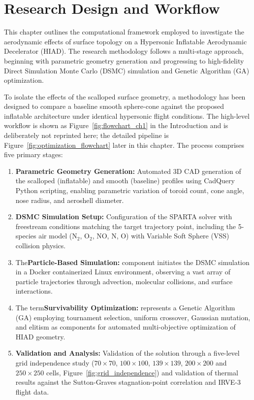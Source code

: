 \section{Research Design and Workflow}
This chapter outlines the computational framework employed to investigate the aerodynamic effects of surface topology on a Hypersonic Inflatable Aerodynamic Decelerator (HIAD). The research methodology follows a multi-stage approach, beginning with parametric geometry generation and progressing to high-fidelity Direct Simulation Monte Carlo (DSMC) simulation and Genetic Algorithm (GA) optimization.

To isolate the effects of the scalloped surface geometry, a methodology has been designed to compare a baseline smooth sphere-cone against the proposed inflatable architecture under identical hypersonic flight conditions. The high-level workflow is shown as Figure~\ref{fig:flowchart_ch1} in the Introduction and is deliberately not reprinted here; the detailed pipeline is Figure~\ref{fig:optimization_flowchart} later in this chapter. The process comprises five primary stages:
\begin{enumerate}
    \item \textbf{Parametric Geometry Generation:} Automated 3D CAD generation of the scalloped (inflatable) and smooth (baseline) profiles using CadQuery Python scripting, enabling parametric variation of toroid count, cone angle, nose radius, and aeroshell diameter.

    \item \textbf{DSMC Simulation Setup:} Configuration of the SPARTA solver with freestream conditions matching the target trajectory point, including the 5-species air model (N$_2$, O$_2$, NO, N, O) with Variable Soft Sphere (VSS) collision physics.

    \item The\textbf{Particle-Based Simulation:} component initiates the DSMC simulation in a Docker containerized Linux environment, observing a vast array of particle trajectories through advection, molecular collisions, and surface interactions.
    \item The term\textbf{Survivability Optimization:} represents a Genetic Algorithm (GA) employing tournament selection, uniform crossover, Gaussian mutation, and elitism as components for automated multi-objective optimization of HIAD geometry.

    \item \textbf{Validation and Analysis:} Validation of the solution through a five-level grid independence study ($70\times70$, $100\times100$, $139\times139$, $200\times200$ and $250\times250$ cells, Figure~\ref{fig:grid_independence}) and validation of thermal results against the Sutton-Graves stagnation-point correlation and IRVE-3 flight data.
\end{enumerate}

